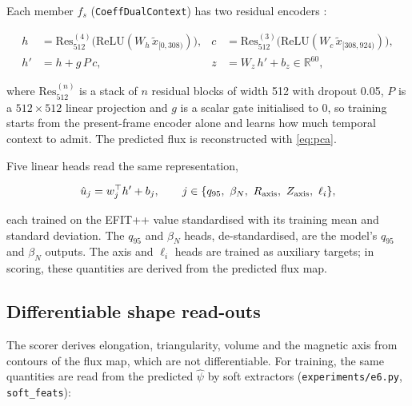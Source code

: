 \documentclass[11pt,a4paper]{article}
\numberwithin{equation}{section}
\begin{document}
Each member \(f_s\) (\texttt{CoeffDualContext}) has two residual encoders \cite{he2016}:

\begin{equation}
\begin{aligned}
h &= \mathrm{Res}^{(4)}_{512}\big(\mathrm{ReLU}(W_h\,\tilde x_{[0,308)})\big), &
c &= \mathrm{Res}^{(3)}_{512}\big(\mathrm{ReLU}(W_c\,\tilde x_{[308,924)})\big),\\
h' &= h + g\,P\,c, & z &= W_z\,h' + b_z\in\mathbb R^{60},
\end{aligned}
\label{eq:net}
\end{equation}

where \(\mathrm{Res}^{(n)}_{512}\) is a stack of \(n\) residual blocks of width 512 with dropout 0.05, \(P\) is a \(512\times512\) linear projection and \(g\) is a scalar gate initialised to 0, so training starts from the present-frame encoder alone and learns how much temporal context to admit. The predicted flux is reconstructed with \eqref{eq:pca}.

Five linear heads read the same representation,

\[
\hat u_j = w_j^{\top}h' + b_j,\qquad j\in\{q_{95},\ \beta_N,\ R_{\rm axis},\ Z_{\rm axis},\ \ell_i\},
\]

each trained on the EFIT++ value standardised with its training mean and standard deviation. The \(q_{95}\) and \(\beta_N\) heads, de-standardised, are the model's \(q_{95}\) and \(\beta_N\) outputs. The axis and \(\ell_i\) heads are trained as auxiliary targets; in scoring, these quantities are derived from the predicted flux map.

\hypertarget{differentiable-shape-read-outs}{%
\subsection{Differentiable shape read-outs}\label{differentiable-shape-read-outs}}

The scorer derives elongation, triangularity, volume and the magnetic axis from contours of the flux map, which are not differentiable. For training, the same quantities are read from the predicted \(\hat\psi\) by soft extractors (\nolinkurl{experiments/e6.py}, \texttt{soft\_feats}):
\end{document}
